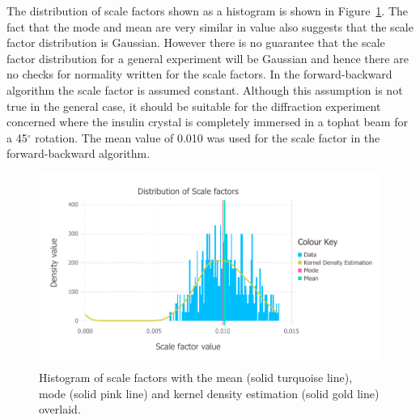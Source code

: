 The distribution of scale factors shown as a histogram is shown in Figure~\ref{fig:Scale factor distribution after outlier removal - insulin}.
The fact that the mode and mean are very similar in value also suggests that the scale factor distribution is Gaussian.
However there is no guarantee that the scale factor distribution for a general experiment will be Gaussian and hence there are no checks for normality written for the scale factors.
In the forward-backward algorithm the scale factor is assumed constant.
Although this assumption is not true in the general case, it should be suitable for the diffraction experiment concerned where the insulin crystal is completely immersed in a tophat beam for a 45$^{\circ}$ rotation.
The mean value of 0.010 was used for the scale factor in the forward-backward algorithm.
\begin{figure}[ht!]
    \centering
    \includegraphics[width=1.0\textwidth]{figures/datared/ScaleFac_Distribution.pdf}
    \caption{Histogram of scale factors with the mean (solid turquoise line), mode (solid pink line) and kernel density estimation (solid gold line) overlaid.}
    \label{fig:Scale factor distribution after outlier removal - insulin}
\end{figure}

